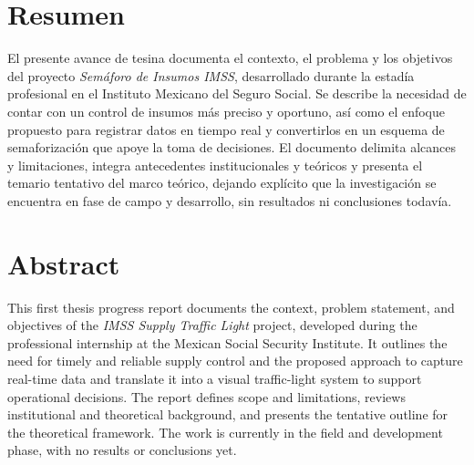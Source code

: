 \documentclass[12pt]{article}
\newcommand{\nasesorinstitucional}{Dr. Said Polanco Martagón}
\begin{document}




\clearpage
\ClearWallPaper
\thispagestyle{fancy}
\section*{Resumen}

El presente avance de tesina documenta el contexto, el problema y los objetivos del proyecto \textit{Semáforo de Insumos IMSS}, desarrollado durante la estadía profesional en el Instituto Mexicano del Seguro Social. Se describe la necesidad de contar con un control de insumos más preciso y oportuno, así como el enfoque propuesto para registrar datos en tiempo real y convertirlos en un esquema de semaforización que apoye la toma de decisiones. El documento delimita alcances y limitaciones, integra antecedentes institucionales y teóricos y presenta el temario tentativo del marco teórico, dejando explícito que la investigación se encuentra en fase de campo y desarrollo, sin resultados ni conclusiones todavía.


\clearpage
\thispagestyle{fancy}
\section*{Abstract}

This first thesis progress report documents the context, problem statement, and objectives of the \textit{IMSS Supply Traffic Light} project, developed during the professional internship at the Mexican Social Security Institute. It outlines the need for timely and reliable supply control and the proposed approach to capture real-time data and translate it into a visual traffic-light system to support operational decisions. The report defines scope and limitations, reviews institutional and theoretical background, and presents the tentative outline for the theoretical framework. The work is currently in the field and development phase, with no results or conclusions yet.

\clearpage

\thispagestyle{empty}
\ClearWallPaper
\tableofcontents
\end{document}
